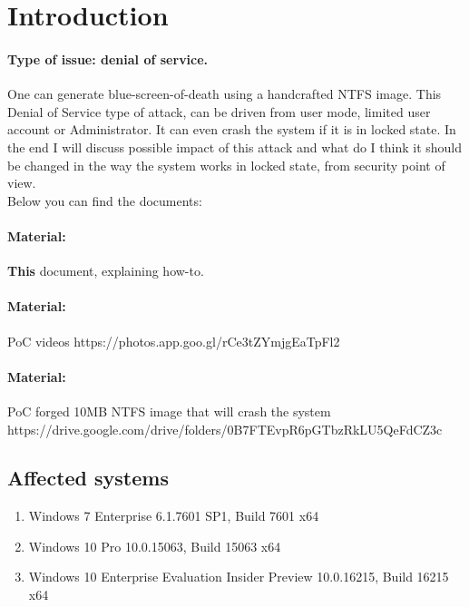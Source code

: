 \documentclass[12pt]{article}
\begin{document}
\maketitle

\section{Introduction}
\paragraph{Type of issue: denial of service.}
One can generate blue-screen-of-death using a handcrafted NTFS image. This Denial of Service type of attack, can be driven from user mode, limited user account or Administrator. It can even crash the system if it is in locked state.
In the end I will discuss possible impact of this attack and what do I think it should be changed in the way the system works in locked state, from security point of view.\\ 

Below you can find the documents:

\paragraph{Material: }
\textbf{This} document, explaining how-to.
\paragraph{Material: }
PoC videos https://photos.app.goo.gl/rCe3tZYmjgEaTpFl2
\paragraph{Material: }
PoC forged 10MB NTFS image that will crash the system \\
https://drive.google.com/drive/folders/0B7FTEvpR6pGTbzRkLU5QeFdCZ3c

\subsection{Affected systems}
\begin{enumerate}
\item Windows 7 Enterprise 6.1.7601 SP1, Build 7601 x64
\item Windows 10 Pro 10.0.15063, Build 15063 x64
\item Windows 10 Enterprise Evaluation Insider Preview 10.0.16215, Build 16215 x64

\end{enumerate}
\end{document}
